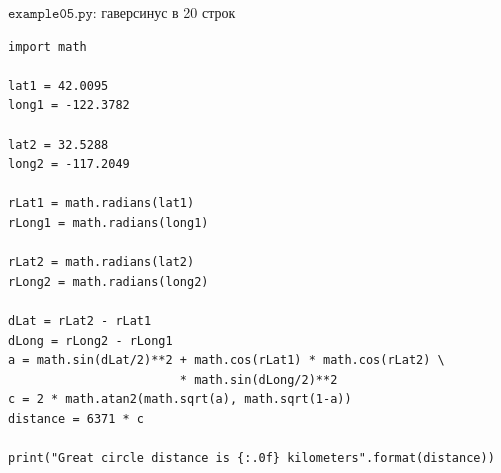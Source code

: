 \documentclass[aspectratio=169,10pt]{beamer}
\begin{document}
\begin{frame}[fragile]{$\texttt{example05.py}$: гаверсинус в 20 строк}
\begin{Verbatim}
import math

lat1 = 42.0095
long1 = -122.3782

lat2 = 32.5288
long2 = -117.2049

rLat1 = math.radians(lat1)
rLong1 = math.radians(long1)

rLat2 = math.radians(lat2)
rLong2 = math.radians(long2)

dLat = rLat2 - rLat1
dLong = rLong2 - rLong1
a = math.sin(dLat/2)**2 + math.cos(rLat1) * math.cos(rLat2) \
                        * math.sin(dLong/2)**2
c = 2 * math.atan2(math.sqrt(a), math.sqrt(1-a))
distance = 6371 * c

print("Great circle distance is {:.0f} kilometers".format(distance))
\end{Verbatim}
\end{frame}
\end{document}
